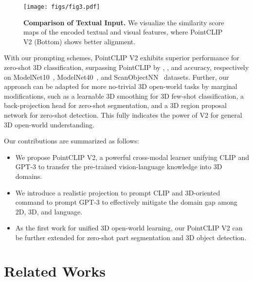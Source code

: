 \documentclass[10pt,twocolumn,letterpaper]{article}
\begin{document}
\begin{figure}[t!]
\centering
\texttt{[image: figs/fig3.pdf]}
\caption{\textbf{Comparison of Textual Input.} We visualize the similarity score maps of the encoded textual and visual features, where PointCLIP V2 (Bottom) shows better alignment.}
\vspace{-0.3cm}
\label{fig3}
\end{figure}

With our prompting schemes, PointCLIP V2 exhibits superior performance for zero-shot 3D classification, surpassing PointCLIP by , , and  accuracy, respectively on ModelNet10~\cite{wu20153d}, ModelNet40~\cite{wu20153d}, and ScanObjectNN~\cite{uy2019revisiting} datasets. Further, our approach can be adapted for more no-trivial 3D open-world tasks by marginal modifications, such as a learnable 3D smoothing for 3D few-shot classification, a back-projection head for zero-shot segmentation, and a 3D region proposal network for zero-shot detection. This fully indicates the power of V2 for general 3D open-world understanding.

Our contributions are summarized as follows:

\begin{itemize}
    \item We propose PointCLIP V2, a powerful cross-modal learner unifying CLIP and GPT-3 to transfer the pre-trained vision-language knowledge into 3D domains. 
    
    \item We introduce a realistic projection to prompt CLIP and 3D-oriented command to prompt GPT-3 to effectively mitigate the domain gap among 2D, 3D, and language.
    
    \item As the first work for unified 3D open-world learning, our PointCLIP V2 can be further extended for zero-shot part segmentation and 3D object detection.
\end{itemize}


\section{Related Works}
\label{sec:related work}
\end{document}
